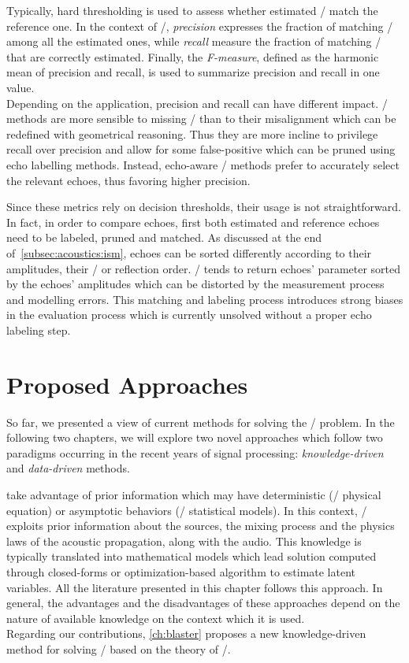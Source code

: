 \begin{itemize}
{\begin{equation*}
        \end{equation*}
    } Typically, hard thresholding is used to assess whether estimated \TOAs/ match the reference one.
    In the context of \AER/, \textit{precision} expresses the fraction of matching \TOAs/ among all the estimated ones, while \textit{recall} measure the fraction of matching \TOAs/ that are correctly estimated.
    Finally, the \textit{F-measure}, defined as the harmonic mean of precision and recall, is used to summarize precision and recall in one value.
    \\Depending on the application, precision and recall can have different impact.
    \RooGE/ methods are more sensible to missing \TOAs/ than to their misalignment which can be redefined with geometrical reasoning.
    Thus they are more incline to privilege recall over precision and allow for some false-positive which can be pruned using echo labelling methods.
    Instead, echo-aware \SE/ methods prefer to accurately select the relevant echoes, thus favoring higher precision.
\end{itemize}

\mynewline
Since these metrics rely on decision thresholds, their usage is not straightforward.
In fact, in order to compare echoes, first both estimated and reference echoes need to be labeled, pruned and matched.
As discussed at the end of~\cref{subsec:acoustics:ism}, echoes can be sorted differently according to their amplitudes, their \TOAs/ or reflection order.
\AER/ tends to return echoes' parameter sorted by the echoes' amplitudes which can be distorted by the measurement process and modelling errors.
This matching and labeling process introduces strong biases in the evaluation process which is currently unsolved without a proper echo labeling step.

\section{Proposed Approaches}
So far, we presented a view of current methods for solving the \AER/ problem.
In the following two chapters, we will explore two novel approaches which follow two paradigms occurring in the recent years of signal processing:
\textit{knowledge-driven} and \textit{data-driven} methods.

 take advantage of prior information which may have deterministic (\eg/ physical equation) or asymptotic behaviors (\eg/ statistical models).
In this context, \AER/ exploits prior information about the sources, the mixing process and the physics laws of the acoustic propagation, along with the audio.
This knowledge is typically translated into mathematical models which lead solution computed through closed-forms or optimization-based algorithm to estimate latent variables.
All the literature presented in this chapter follows this approach.
In general, the advantages and the disadvantages of these approaches depend on the nature of available knowledge on the context which it is used.
\\Regarding our contributions, \cref{ch:blaster} proposes a new knowledge-driven method for solving \AER/ based on the theory of \CDdef/.

